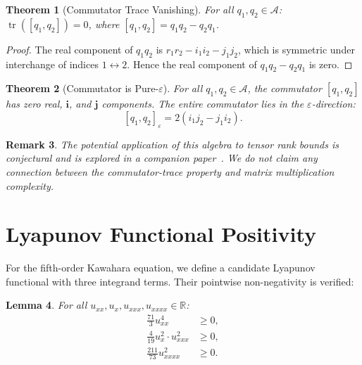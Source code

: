 \documentclass[11pt,a4paper]{article}
\newtheorem{theorem}{Theorem}[section]
\newtheorem{lemma}[theorem]{Lemma}
\newtheorem{remark}[theorem]{Remark}
\begin{document}
\begin{theorem}[Commutator Trace Vanishing]
\label{thm:comm-trace}
For all $q_1, q_2 \in \mathcal{A}$:
$\operatorname{tr}([q_1, q_2]) = 0$,
where $[q_1, q_2] = q_1 q_2 - q_2 q_1$.
\end{theorem}

\begin{proof}
The real component of $q_1 q_2$ is
$r_1 r_2 - i_1 i_2 - j_1 j_2$, which is symmetric under
interchange of indices $1 \leftrightarrow 2$. Hence the real
component of $q_1 q_2 - q_2 q_1$ is zero.
\end{proof}


\begin{theorem}[Commutator is Pure-$\varepsilon$]
\label{thm:pure-eps}
For all $q_1, q_2 \in \mathcal{A}$, the commutator $[q_1, q_2]$
has zero real, $\mathbf{i}$, and $\mathbf{j}$ components. The entire
commutator lies in the $\varepsilon$-direction:
\[
  [q_1, q_2]_\varepsilon = 2(i_1 j_2 - j_1 i_2).
\]
\end{theorem}

\begin{remark}
The potential application of this algebra to tensor rank bounds is
\emph{conjectural} and is explored in a companion paper~\cite{callens2026b}.
We do not claim any connection between the commutator-trace property
and matrix multiplication complexity.
\end{remark}


\section{Lyapunov Functional Positivity}
\label{sec:lyapunov}


For the fifth-order Kawahara equation, we define a candidate
Lyapunov functional with three integrand terms. Their pointwise
non-negativity is verified:

\begin{lemma}
\label{lem:lyap}
For all $u_{xx}, u_x, u_{xxx}, u_{xxxx} \in \mathbb{R}$:
\begin{align}
  \frac{71}{3} u_{xx}^4 &\geq 0, \label{eq:t1}\\
  \frac{4}{19} u_x^2 \cdot u_{xxx}^2 &\geq 0, \label{eq:t2}\\
  \frac{211}{73} u_{xxxx}^2 &\geq 0. \label{eq:t3}
\end{align}
\end{lemma}
\end{document}
